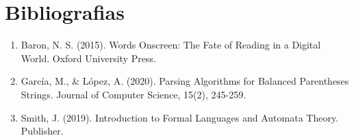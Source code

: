 \chapter{Bibliografias}
\begin{enumerate}
    \item Baron, N. S. (2015). Words Onscreen: The Fate of Reading in a Digital World. Oxford University Press.\newline
    \item García, M., & López, A. (2020). Parsing Algorithms for Balanced Parentheses Strings. Journal of Computer Science, 15(2), 245-259. \newline
    \item Smith, J. (2019). Introduction to Formal Languages and Automata Theory. Publisher.\newline
\end{enumerate}





